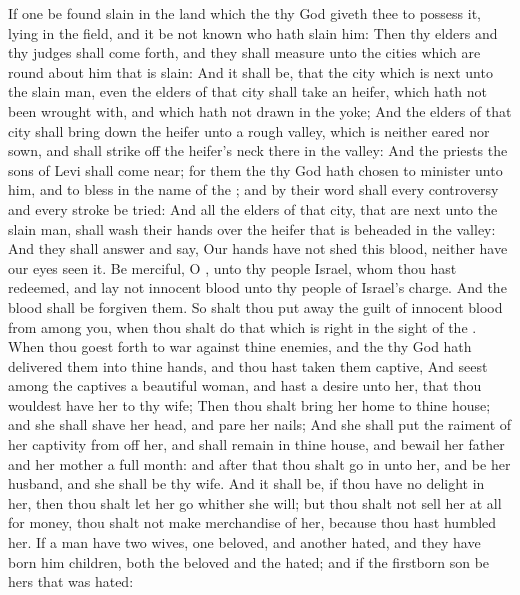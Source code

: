 \begin{biblechapter} %
 If one be found slain in the land which the \LORD thy God giveth thee to possess it, lying in the field, and it be not known who hath slain him:
\verse Then thy elders and thy judges shall come forth, and they shall measure unto the cities which are round about him that is slain:
\verse And it shall be, that the city which is next unto the slain man, even the elders of that city shall take an heifer, which hath not been wrought with, and which hath not drawn in the yoke;
\verse And the elders of that city shall bring down the heifer unto a rough valley, which is neither eared nor sown, and shall strike off the heifer's neck there in the valley:
\verse And the priests the sons of Levi shall come near; for them the \LORD thy God hath chosen to minister unto him, and to bless in the name of the \LORD; and by their word shall every controversy and every stroke be tried:
\verse And all the elders of that city, that are next unto the slain man, shall wash their hands over the heifer that is beheaded in the valley:
\verse And they shall answer and say, Our hands have not shed this blood, neither have our eyes seen it.
\verse Be merciful, O \LORD, unto thy people Israel, whom thou hast redeemed, and lay not innocent blood unto thy people of Israel's charge. And the blood shall be forgiven them.
\verse So shalt thou put away the guilt of innocent blood from among you, when thou shalt do that which is right in the sight of the \LORD.
 When thou goest forth to war against thine enemies, and the \LORD thy God hath delivered them into thine hands, and thou hast taken them captive,
\verse And seest among the captives a beautiful woman, and hast a desire unto her, that thou wouldest have her to thy wife;
\verse Then thou shalt bring her home to thine house; and she shall shave her head, and pare her nails;
\verse And she shall put the raiment of her captivity from off her, and shall remain in thine house, and bewail her father and her mother a full month: and after that thou shalt go in unto her, and be her husband, and she shall be thy wife.
\verse And it shall be, if thou have no delight in her, then thou shalt let her go whither she will; but thou shalt not sell her at all for money, thou shalt not make merchandise of her, because thou hast humbled her.
 If a man have two wives, one beloved, and another hated, and they have born him children, both the beloved and the hated; and if the firstborn son be hers that was hated:

\end{biblechapter}

